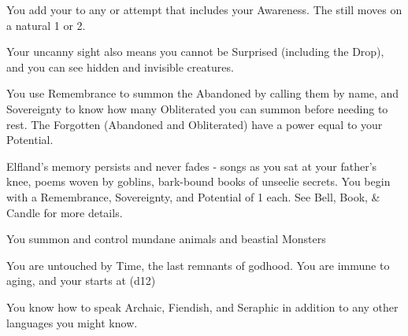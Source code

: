 {  

  You add your \LVL to any \RO or \RB attempt that includes your Awareness.  The \UD still moves \DCDOWN on a natural 1 or 2.

  Your uncanny sight also means you cannot be Surprised (including the Drop), and you can see hidden and invisible creatures.


   You use Remembrance to summon the Abandoned by calling them by name, and Sovereignty to know how many Obliterated you can summon before needing to rest.  The Forgotten (Abandoned and Obliterated) have a power equal to your Potential.




    
  Elfland's memory persists and never fades - songs as you sat at your father's knee, poems woven by goblins, bark-bound books of unseelie secrets. You begin with a Remembrance, Sovereignty, and Potential of 1 each.  See Bell, Book, \& Candle for more details.


   You summon and control mundane animals and beastial Monsters\footnotemark[\value{footnote}]

  
  You are untouched by Time, the last remnants of godhood.  You are immune to aging, and your \DEATH starts at  (d12)  


  You know how to speak Archaic, Fiendish, and Seraphic in addition to any other languages you might know.

}
